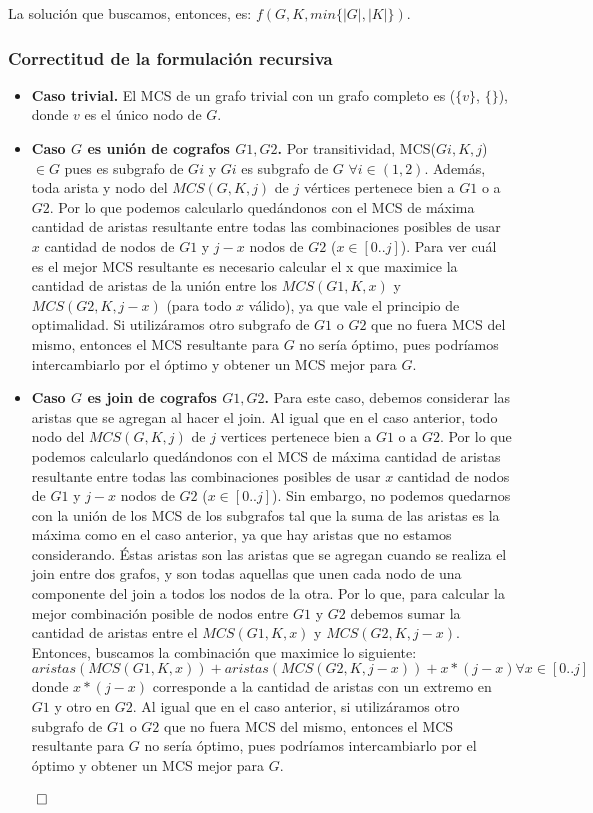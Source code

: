 La solución que buscamos, entonces, es: $f(G, K, min \{|G|, |K|\})$.

\subsubsection{Correctitud de la formulación recursiva}

\begin{itemize}
\item \textbf{Caso trivial.} El MCS de un grafo trivial con un grafo completo es ($\{v\}$, $\{\}$), donde $v$ es el único nodo de $G$.
\item \textbf{Caso $G$ es unión de cografos $G1, G2$.} Por transitividad, MCS($Gi, K, j$) $\in G$ pues es subgrafo de $Gi$ y $Gi$ es subgrafo de $G$ $\forall i \in (1,2)$. Además, toda arista y nodo del $MCS(G,K,j)$ de $j$ v\'ertices pertenece bien a $G1$ o a $G2$. Por lo que podemos calcularlo quedándonos con el MCS de máxima cantidad de aristas resultante entre todas las combinaciones posibles de usar $x$ cantidad de nodos de $G1$ y $j-x$ nodos de $G2$ ($x \in [0..j]$). Para ver cuál es el mejor MCS resultante es necesario calcular el x que maximice la cantidad de aristas de la unión entre los $MCS(G1,K,x)$  y $MCS(G2,K,j-x)$ (para todo $x$ válido), ya que vale el principio de optimalidad. Si utilizáramos otro subgrafo de $G1$ o $G2$ que no fuera MCS del mismo, entonces el MCS resultante para $G$ no sería óptimo, pues podríamos intercambiarlo por el óptimo y obtener un MCS mejor para $G$.
\item \textbf{Caso $G$ es join de cografos $G1, G2$.} Para este caso, debemos considerar las aristas que se agregan al hacer el join. Al igual que en el caso anterior, todo nodo del $MCS(G,K,j)$ de $j$ vertices pertenece bien a $G1$ o a $G2$. Por lo que podemos calcularlo quedándonos con el MCS de máxima cantidad de aristas resultante entre todas las combinaciones posibles de usar $x$ cantidad de nodos de $G1$ y $j-x$ nodos de $G2$ ($x \in [0..j]$). Sin embargo, no podemos quedarnos con la unión de los MCS de los subgrafos tal que la suma de las aristas es la máxima como en el caso anterior, ya que hay aristas que no estamos considerando. Éstas aristas son las aristas que se agregan cuando se realiza el join entre dos grafos, y son todas aquellas que unen cada nodo de una componente del join a todos los nodos de la otra. Por lo que, para calcular la mejor combinación posible de nodos entre $G1$ y $G2$ debemos sumar la cantidad de aristas entre el $MCS(G1,K,x)$  y $MCS(G2,K,j-x)$. Entonces, buscamos la combinación que maximice lo siguiente:
\[ aristas(MCS(G1,K,x)) + aristas(MCS(G2,K,j-x)) + x*(j-x) \forall x \in [0..j] \]
donde $x*(j-x)$ corresponde a la cantidad de aristas con un extremo en $G1$ y otro en $G2$. Al igual que en el caso anterior, si utilizáramos otro subgrafo de $G1$ o $G2$ que no fuera MCS del mismo, entonces el MCS resultante para $G$ no sería óptimo, pues podríamos intercambiarlo por el óptimo y obtener un MCS mejor para $G$.
\end{itemize}
$\qed$

